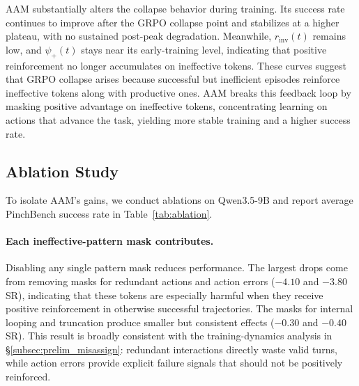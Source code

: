 \documentclass[letterpaper]{article} %
\begin{document}
AAM substantially alters the collapse behavior during training.
Its success rate continues to improve after the GRPO collapse point and stabilizes at a higher plateau, with no sustained post-peak degradation.
Meanwhile, $r_{\mathrm{inv}}(t)$ remains low, and $\psi_+(t)$ stays near its early-training level, indicating that positive reinforcement no longer accumulates on ineffective tokens.
These curves suggest that GRPO collapse arises because successful but inefficient episodes reinforce ineffective tokens along with productive ones.
AAM breaks this feedback loop by masking positive advantage on ineffective tokens, concentrating learning on actions that advance the task, yielding more stable training and a higher success rate.



\subsection{Ablation Study}
\label{subsec:ablation}
To isolate AAM's gains, we conduct ablations on Qwen3.5-9B and report average PinchBench success rate in Table~\ref{tab:ablation}.

\paragraph{Each ineffective-pattern mask contributes.}
Disabling any single pattern mask reduces performance.
The largest drops come from removing masks for redundant actions and action errors ($-4.10$ and $-3.80$ SR), indicating that these tokens are especially harmful when they receive positive reinforcement in otherwise successful trajectories.
The masks for internal looping and truncation produce smaller but consistent effects ($-0.30$ and $-0.40$ SR).
This result is broadly consistent with the training-dynamics analysis in \S\ref{subsec:prelim_misassign}: redundant interactions directly waste valid turns, while action errors provide explicit failure signals that should not be positively reinforced.
\end{document}
